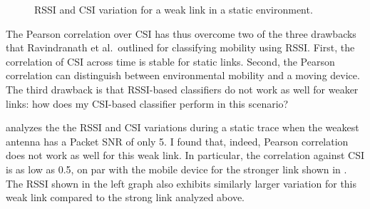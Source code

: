 \begin{figure}[tp]
	\centering
	\hspace{0.03\textwidth}%
	\caption{\label{fig:mobility_example_weak}RSSI and CSI variation for a weak link in a static environment.}
\end{figure}

The Pearson correlation over CSI has thus overcome two of the three drawbacks that Ravindranath et al.\ outlined for classifying mobility using RSSI. First, the correlation of CSI across time is stable for static links. Second, the Pearson correlation can distinguish between environmental mobility and a moving device. The third drawback is that RSSI-based classifiers do not work as well for weaker links: how does my CSI-based classifier perform in this scenario? 

 analyzes the the RSSI and CSI variations during a static trace when the weakest antenna has a Packet SNR of only 5\dB. I found that, indeed, Pearson correlation does not work as well for this weak link. In particular, the correlation against CSI is as low as 0.5, on par with the mobile device for the stronger link shown in . The RSSI shown in the left graph also exhibits similarly larger variation for this weak link compared to the strong link analyzed above.

